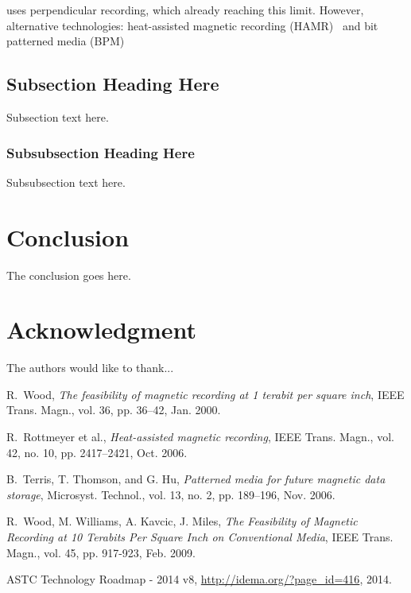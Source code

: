 \documentclass[conference]{IEEEtran}
\begin{document}
uses perpendicular recording, which already reaching this limit.
However, alternative technologies: heat-assisted magnetic recording (HAMR)~\cite{Rottmeyer} and bit patterned media (BPM)~\cite{Terris}

\subsection{Subsection Heading Here}
Subsection text here.


\subsubsection{Subsubsection Heading Here}
Subsubsection text here.



\section{Conclusion}
The conclusion goes here.


\section*{Acknowledgment}


The authors would like to thank...

\begin{thebibliography}{1}

R.~Wood, \emph{The feasibility of magnetic recording at 1 terabit per square
inch}, IEEE Trans. Magn., vol. 36, pp. 36–42, Jan. 2000.

R.~Rottmeyer et al., \emph{Heat-assisted magnetic recording}, IEEE Trans.
Magn., vol. 42, no. 10, pp. 2417–2421, Oct. 2006.

B.~Terris, T. Thomson, and G. Hu, \emph{Patterned media for future magnetic
data storage}, Microsyst. Technol., vol. 13, no. 2, pp. 189–196, Nov.
2006.

R.~Wood, M. Williams, A. Kavcic, J. Miles, \emph{The Feasibility of Magnetic Recording at 10 Terabits Per Square Inch on Conventional Media}, IEEE Trans. Magn., vol. 45, pp. 917-923, Feb. 2009.

ASTC Technology Roadmap - 2014 v8, \url{http://idema.org/?page_id=416}, 2014.

\end{thebibliography}


\end{document}

